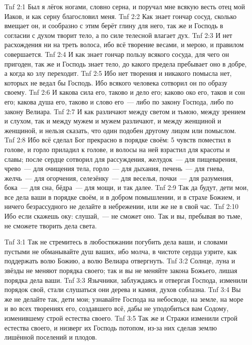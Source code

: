 \vs Tnf 2:1
Был я лёгок ногами, словно серна, и поручал мне всякую весть
отец мой Иаков, и как серну благословил меня.
\vs Tnf 2:2
Как знает гончар сосуд, сколько вмещает он,
и сообразно с этим берёт глину для него,
так же и Господь в согласии с духом творит тело,
а по силе телесной влагает дух.
\vs Tnf 2:3
И нет расхождения ни на треть волоса,
ибо всё творение весами, и мерою, и правилом совершается.
\vs Tnf 2:4
И как знает гончар пользу всякого сосуда, для чего он пригоден,
так же и Господь знает тело,
до какого предела пребывает оно в добре,
а когда ко злу переходит.
\vs Tnf 2:5
Ибо нет творения и никакого помысла нет,
которых не ведал бы Господь.
Ибо всякого человека сотворил он по образу своему.
\vs Tnf 2:6
И какова сила его, таково и дело его;
каково око его, таков и сон его;
какова душа его, таково и слово его~--- либо по закону Господа,
либо по закону Велиара.
\vs Tnf 2:7
И как различают между светом и тьмою,
между зрением и слухом, так и между мужем и мужем различают,
и между женщиной и женщиной, и нельзя сказать,
что один подобен другому лицом или помыслом.
\vs Tnf 2:8
Ибо всё сделал Бог прекрасно в порядке своём:
5 чувств поместил в голове,
и горло приладил к голове,
и волосы на ней взрастил для красоты и славы;
после сердце сотворил для рассуждения,
желудок~--- для пищеварения,
чрево~--- для очищения тела,
горло~--- для дыхания,
печень~--- для гнева,
желчь~--- для огорчения,
селезёнку~--- для веселья,
почки~--- для разумения,
бока~--- для сна,
бёдра~--- для мощи,
и так далее.
\vs Tnf 2:9
Так да будут, дети мои, все дела ваши в порядке своём,
и в добром помышлении,
и в страхе Божием,
и ничего безрассудного не делайте в небрежении,
или же не в свой час.
\vs Tnf 2:10
Ибо если скажешь оку: слушай,~--- не сможет оно.
Так и вы, пребывая во тьме, не сможете творить дела света.

\vs Tnf 3:1
Так не стремитесь в любостяжании погубить дела ваши,
и словами пустыми не обманывайте душ ваших,
ибо молча, в чистоте сердца узрите,
как поддержать волю Божию, а волю Велиара отвергнуть.
\vs Tnf 3:2
Солнце, луна и звёзды не меняют порядка своего;
так и вы не меняйте закона Божьего,
лишая порядка дела ваши.
\vs Tnf 3:3
Язычники, заблуждаясь и отвергая Господа,
изменили порядок свой,
стали слушаться они дерева и камня,
духов соблазна.
\vs Tnf 3:4
Вы же не делайте так, дети мои;
узнавайте Господа на небосводе,
на земле, на море и во всех творениях его,
создавшего всё,
дабы не уподобиться вам Содому,
изменившему строй естества своего.
\vs Tnf 3:5
Так же и Стражи изменили строй естества своего,
и низверг их Господь потопом,
из-за них сделав землю лишённой поселений и плодов.

